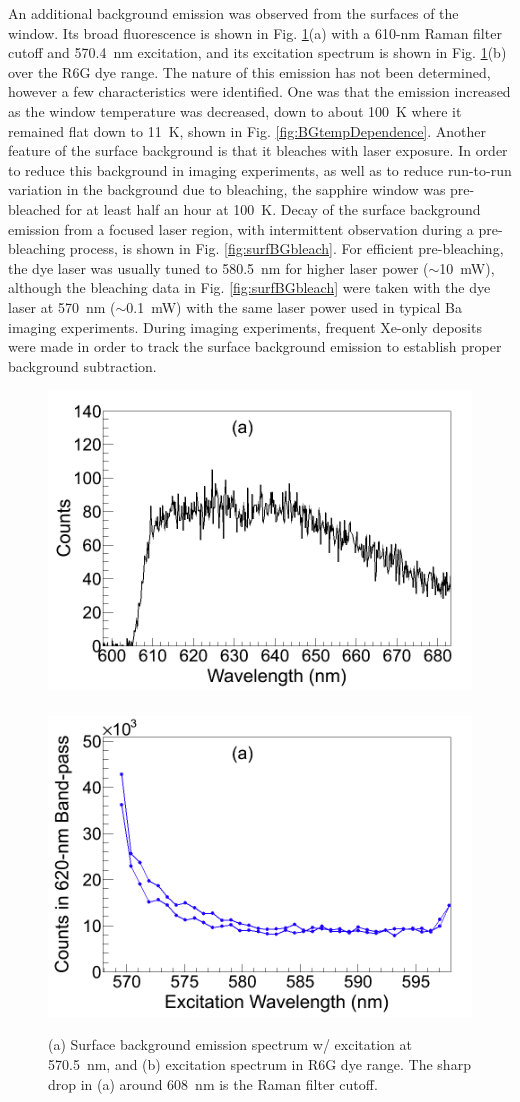 An additional background emission was observed from the surfaces of the window.  Its broad fluorescence is shown in Fig. \ref{fig:surfBG}(a) with a 610-nm Raman filter cutoff and 570.4~nm excitation, and its excitation spectrum is shown in Fig. \ref{fig:surfBG}(b) over the R6G dye range.  The nature of this emission has not been determined, however a few characteristics were identified.  One was that the emission increased as the window temperature was decreased, down to about 100~K where it remained flat down to 11~K, shown in Fig. \ref{fig:BGtempDependence}.  Another feature of the surface background is that it bleaches with laser exposure.  In order to reduce this background in imaging experiments, as well as to reduce run-to-run variation in the background due to bleaching, the sapphire window was pre-bleached for at least half an hour at 100~K.  Decay of the surface background emission from a focused laser region, with intermittent observation during a pre-bleaching process, is shown in Fig. \ref{fig:surfBGbleach}.  For efficient pre-bleaching, the dye laser was usually tuned to 580.5~nm for higher laser power ($\sim$10~mW), although the bleaching data in Fig. \ref{fig:surfBGbleach} were taken with the dye laser at 570~nm ($\sim$0.1~mW) with the same laser power used in typical Ba imaging experiments.  During imaging experiments, frequent Xe-only deposits were made in order to track the surface background emission to establish proper background subtraction.

\begin{figure} %
        \centering
                \includegraphics[width=.5\textwidth]{figures/surfaceBG_a.png}
                ~
                \includegraphics[width=.5\textwidth]{figures/surfaceBG_b.png}
                \caption{(a) Surface background emission spectrum w/ excitation at 570.5~nm, and (b) excitation spectrum in R6G dye range.  The sharp drop in (a) around 608~nm is the Raman filter cutoff.}
\label{fig:surfBG}
\end{figure}

